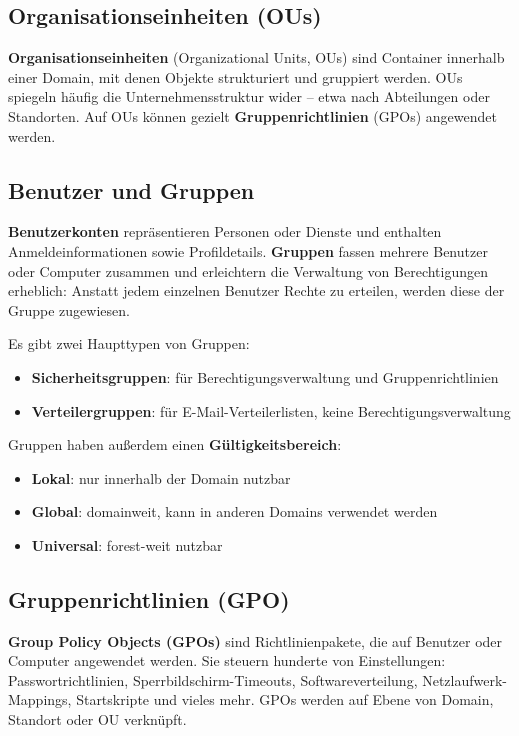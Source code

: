 \documentclass[11pt, oneside, numbers=noenddot]{scrbook}
\begin{document}
\subsection{Organisationseinheiten (OUs)}
\textbf{Organisationseinheiten} (Organizational Units, OUs) sind Container innerhalb einer Domain, mit denen Objekte strukturiert und gruppiert werden. OUs spiegeln häufig die Unternehmensstruktur wider -- etwa nach Abteilungen oder Standorten. Auf OUs können gezielt \textbf{Gruppenrichtlinien} (GPOs) angewendet werden.

\subsection{Benutzer und Gruppen}
\textbf{Benutzerkonten} repräsentieren Personen oder Dienste und enthalten Anmeldeinformationen sowie Profildetails. \textbf{Gruppen} fassen mehrere Benutzer oder Computer zusammen und erleichtern die Verwaltung von Berechtigungen erheblich: Anstatt jedem einzelnen Benutzer Rechte zu erteilen, werden diese der Gruppe zugewiesen.

Es gibt zwei Haupttypen von Gruppen:
\begin{itemize}
  \item \textbf{Sicherheitsgruppen}: für Berechtigungsverwaltung und Gruppenrichtlinien
  \item \textbf{Verteilergruppen}: für E-Mail-Verteilerlisten, keine Berechtigungsverwaltung
\end{itemize}

Gruppen haben außerdem einen \textbf{Gültigkeitsbereich}:
\begin{itemize}
  \item \textbf{Lokal}: nur innerhalb der Domain nutzbar
  \item \textbf{Global}: domainweit, kann in anderen Domains verwendet werden
  \item \textbf{Universal}: forest-weit nutzbar
\end{itemize}

\subsection{Gruppenrichtlinien (GPO)}
\textbf{Group Policy Objects (GPOs)} sind Richtlinienpakete, die auf Benutzer oder Computer angewendet werden. Sie steuern hunderte von Einstellungen: Passwortrichtlinien, Sperrbildschirm-Timeouts, Softwareverteilung, Netzlaufwerk-Mappings, Startskripte und vieles mehr. GPOs werden auf Ebene von Domain, Standort oder OU verknüpft.
\end{document}
